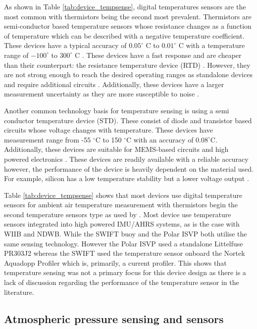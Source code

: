 As shown in Table \ref{tab:device_tempsense}, digital temperatures sensors are the most common with thermistors being the second most prevalent. Thermistors are semi-conductor based temperature sensors whose resistance changes as a function of temperature which can be described with a negative temperature coefficient. These devices have a typical accuracy of $0.05^\circ$ C to $0.01^\circ$ C with a temperature range of  $-100^\circ $ to $ 300^\circ$ C \cite{childs2000review}. These devices have a fast response and are cheaper than their counterpart: the resistance temperature device (RTD) \cite{childs2000review}. However, they are not strong enough to reach the desired operating ranges as standalone devices and require additional circuits \cite{tong2001improving}. Additionally, these devices have a larger measurement uncertainty as they are more susceptible to noise \cite{childs2000review}.\par 

Another common technology basis for temperature sensing is using a semi conductor temperature device (STD). These consist of diode and transistor based circuits whose voltage changes with temperature. These devices have measurement range from -55 $^\circ$C  to 150 $^\circ $C with an accuracy of $0.08 ^\circ $C. Additionally, these devices are suitable for MEMS-based circuits and high powered electronics \cite{willander2006silicon}. These devices are readily available with a reliable accuracy however, the performance of the device is heavily dependent on the material used. For example, silicon has a low temperature stability but a lower voltage output \cite{childs2000review}.

Table \ref{tab:device_tempsense} shows that most devices use digital temperature sensors for ambient air temperature measurement with thermistors begin the second temperature sensors type as used by \textcite{thomson2012wave}. Most device use temperature sensors integrated into high powered IMU/AHRS systems, as is the case with WIIB and NDWB. While the SWIFT buoy and the Polar ISVP both utilise the same sensing technology. However the Polar ISVP used a standalone Littelfuse PR303J2 whereas the SWIFT used the temperature sensor onboard the Nortek Aquadopp Profiler which is, primarily, a current profiler. This shows that temperature sensing was not a primary focus for this device design as there is a lack of discussion regarding the performance of the temperature sensor in the literature.


\subsection{Atmospheric pressure sensing and sensors}

